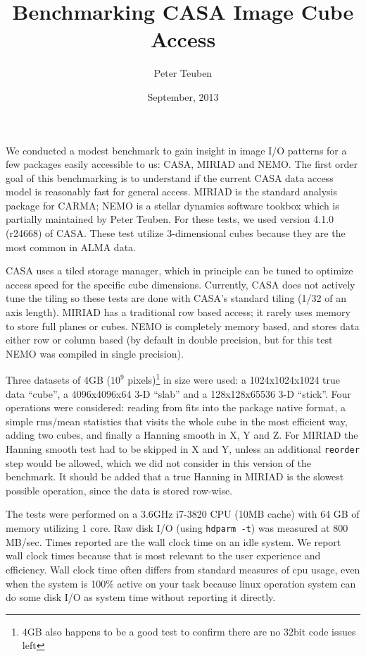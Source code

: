 \documentclass{article}
\title{Benchmarking CASA Image Cube Access}
\author{Peter Teuben}
\date{September, 2013}
\begin{document}
\maketitle


We conducted a modest benchmark to gain insight in image
I/O patterns for a few packages easily accessible to us: CASA,
MIRIAD and NEMO. The first order goal of this benchmarking is
to understand if the
current CASA data access model is reasonably fast for general
access.
MIRIAD is the standard analysis package for
CARMA; NEMO is a stellar dynamics software tookbox which is
partially maintained by Peter Teuben. For these tests, we
used version 4.1.0 (r24668) of CASA. These test utilize 3-dimensional cubes
because they are the most common in ALMA data.

CASA uses a tiled storage manager, which in principle
can be tuned to optimize access speed for the specific
cube dimensions.  Currently, CASA does not actively tune
the tiling so these tests are done with CASA's standard tiling
(1/32 of an axis length).
MIRIAD has a traditional row based access; it rarely
uses memory to store full planes or cubes. NEMO is completely
memory based, and stores data either row or column based
(by default in double precision, but for this test NEMO was compiled 
in single precision).

Three datasets of 4GB ($10^9$ pixels)\footnote{4GB also happens to
be a good test to confirm there are no 32bit code issues left}
in size were used:
a 1024x1024x1024 true data ``cube'',
a 4096x4096x64 3-D ``slab'' and a 128x128x65536 3-D ``stick''.
Four operations were considered:  reading from fits
into the package native format,
a simple rms/mean statistics that visits the whole cube in the
most efficient way, adding two cubes, and finally
a Hanning smooth in X, Y and Z.  For MIRIAD
the Hanning smooth test had to be skipped in X and Y, unless
an additional {\tt reorder} step would be allowed, which we did
not consider in this version of the benchmark.
It should be added that a true Hanning in MIRIAD
is the slowest possible operation, since the data is stored
row-wise.

The tests were performed on a 3.6GHz i7-3820 CPU (10MB cache) with 64
GB of memory utilizing 1 core.  Raw disk I/O (using {\tt hdparm -t})
was measured at 800 MB/sec. Times reported are the wall clock time on
an idle system. 
We report wall clock times because that is most relevant to the
user experience and efficiency. Wall clock time often differs from
standard measures of cpu usage, even when the system is 100\% active
on your task because linux operation system can do some disk I/O
as system time without reporting it directly.
\end{document}
